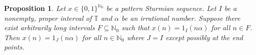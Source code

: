 \documentclass[11pt,reqno]{amsart}
\newtheorem{proposition}[theorem]{Proposition}
\theoremstyle{definition}
\theoremstyle{plain}
\newcommand{\N}{\mathbb{N}}
\newcommand{\T}{\mathbb{T}}
\newcommand{\AuthornoteA}[2]{{\sf\small\color{magenta}{[#1: #2]}}}
\newcommand{\Anote}{\AuthornoteA{A}}
\begin{document}
\begin{proposition}\label{lem:glue_up}
Let $x \in \{0, 1\}^{\N_0}$ be a pattern Sturmian sequence. Let $I$ be a nonempty, proper interval of $\T$ and $\alpha$ be an irrational number. Suppose there exist arbitrarily long intervals $F \subseteq \N_0$ such that $x(n) = 1_I(n \alpha)$ for all $n \in F$. Then $x(n) = 1_J(n \alpha)$ for all $n \in \N_0$ where $J = I$ except possibly at the end points.
\end{proposition}
\end{document}
